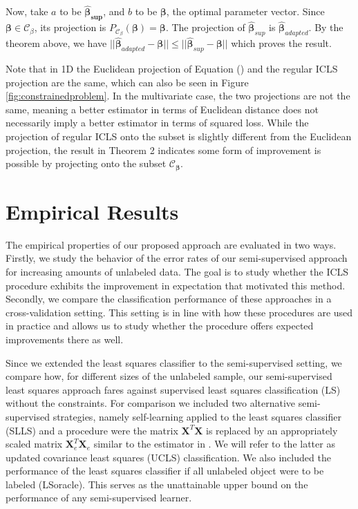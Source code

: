 \documentclass[smallcondensed]{svjour3}
\newcommand{\Xe}{\mathbf{X}_e  }
\newcommand{\XeT}{\mathbf{X}_e^T}
\begin{document}
Now, take $a$ to be $\boldsymbol{\hat{\beta}_{sup}}$, and $b$ to be $\boldsymbol{\beta}$, the optimal parameter vector. Since $\boldsymbol{\beta} \in \mathcal{C}_{\beta}$, its projection is $P_{\mathcal{C}_{\beta}}(\boldsymbol{\beta})=\boldsymbol{\beta}$. The projection of $\boldsymbol{\hat{\beta}}_{sup}$ is $\boldsymbol{\hat{\beta}}_{adapted}$. By the theorem above, we have $||\boldsymbol{\hat{\beta}}_{adapted}-\boldsymbol{\beta}|| \leq ||\boldsymbol{\hat{\beta}}_{sup}-\boldsymbol{\beta}||$ which proves the result.

Note that in 1D the Euclidean projection of Equation () and the regular ICLS projection are the same, which can also be seen in Figure \ref{fig:constrainedproblem}. In the multivariate case, the two projections are not the same, meaning a better estimator in terms of Euclidean distance does not necessarily imply a better estimator in terms of squared loss. While the projection of regular ICLS onto the subset is slightly different from the Euclidean projection, the result in Theorem 2 indicates some form of improvement is possible by projecting onto the subset $\mathcal{C}_{\boldsymbol{\beta}}$. 

\section{Empirical Results} \label{section:empiricalresults}

The empirical properties of our proposed approach are evaluated in two ways. Firstly, we study the behavior of the error rates of our semi-supervised approach for increasing amounts of unlabeled data. The goal is to study whether the ICLS procedure exhibits the improvement in expectation that motivated this method. Secondly, we compare the classification performance of these approaches in a cross-validation setting. This setting is in line with how these procedures are used in practice and allows us to study whether the procedure offers expected improvements there as well.

Since we extended the least squares classifier to the semi-supervised setting, we compare how, for different sizes of the unlabeled sample,  our semi-supervised least squares approach fares against supervised least squares classification (LS) without the constraints. For comparison we included two alternative semi-supervised strategies, namely self-learning applied to the least squares classifier (SLLS) and a procedure were the matrix $\mathbf{X}^T \mathbf{X}$ is replaced by an appropriately scaled matrix $\XeT \Xe$ similar to the estimator in \cite{Shaffer1991}. We will refer to the latter as updated covariance least squares (UCLS) classification. We also included the performance of the least squares classifier if all unlabeled object were to be labeled (LSoracle). This serves as the unattainable upper bound on the performance of any semi-supervised learner. 
\end{document}
